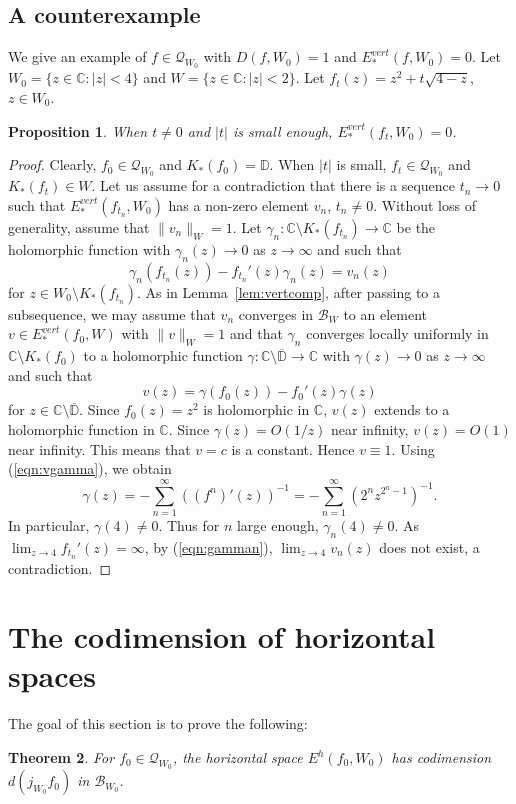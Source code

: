 \documentclass{amsart}
\numberwithin{equation}{section}
\newtheorem{theorem}{Theorem}[section]
\newtheorem{proposition}[theorem]{Proposition}%
\newcommand{\C}{\mathbb C}
\theoremstyle{definition}
\theoremstyle{remark}
\begin{document}
\subsection{A counterexample}\label{subsec:counterex}
We give an example of $f\in \mathcal{Q}_{W_0}$ with $D(f,W_0)=1$ and $E^{vert}_*(f,W_0)=0$. Let $W_0=\{z\in \C:|z|<4\}$ and $W=\{z\in \C: |z|<2\}$. Let $f_t(z)=z^2+t \sqrt{4-z}$, $z\in W_0$. 
\begin{proposition}\label{prop:counterex}
When $t\not=0$ and $|t|$ is small enough, $E^{vert}_*(f_t, W_0)=0$. 
\end{proposition}
\begin{proof}
Clearly, $f_0\in \mathcal{Q}_{W_0}$ and $K_*(f_0)=\mathbb{D}$. When $|t|$ is small, $f_t\in \mathcal{Q}_{W_0}$ and $K_*(f_t)\in W$. 
Let us assume for a contradiction that there is a sequence $t_n\to 0$ such that $E^{vert}_*(f_{t_n}, W_0)$ has a non-zero element $v_n$, $t_n\not=0$. Without loss of generality, assume that $\|v_n\|_{W}=1$. Let $\gamma_n:\C\setminus K_*(f_{t_n})\to \C$ be the holomorphic function with $\gamma_n(z)\to 0$ as $z\to \infty$ and such that 
\begin{equation}\label{eqn:gamman}
\gamma_n(f_{t_n}(z))-f_{t_n}'(z) \gamma_n(z)=v_n(z)
\end{equation}
for $z\in W_0\setminus K_*(f_{t_n})$. As in Lemma~\ref{lem:vertcomp}, after passing to a subsequence, we may assume that $v_n$ converges in $\mathcal{B}_{W}$ to an element $v\in E^{vert}_*(f_0, W)$ with $\|v\|_{W}=1$ and that $\gamma_n$ converges locally uniformly in $\C\setminus K_*(f_0)$ to a holomorphic function $\gamma:\C\setminus \overline{\mathbb{D}}\to \C$ with $\gamma(z)\to 0$ as $z\to \infty$ and such that 
\begin{equation}\label{eqn:vgamma}
v(z)=\gamma(f_0(z))-f_0'(z) \gamma(z)
\end{equation} for $z\in \C\setminus \overline{\mathbb{D}}$. 
Since $f_0(z)=z^2$ is holomorphic in $\C$, $v(z)$ extends to a holomorphic function in $\C$. Since $\gamma(z)=O(1/z)$ near infinity, $v(z)=O(1)$ near infinity. This means that $v=c$ is a constant. Hence $v\equiv 1$. Using (\ref{eqn:vgamma}), we obtain
$$\gamma(z)=-\sum_{n=1}^\infty ((f^n)'(z))^{-1}=-\sum_{n=1}^\infty (2^n z^{2^n-1})^{-1}.$$ 
In particular, $\gamma(4)\not=0$. Thus for $n$ large enough, $\gamma_n(4)\not=0$. 
As $\lim_{z\to 4}f_{t_n}'(z)=\infty$, by (\ref{eqn:gamman}), $\lim_{z\to 4} v_n(z)$ does not exist, a contradiction. 
\end{proof}


\section{The codimension of horizontal spaces}\label{sec:codim}
The goal of this section is to prove the following:
\begin{theorem}\label{thm:dimension}
For $f_0\in \mathcal{Q}_{W_0}$,  the horizontal space $E^h(f_0,W_0)$ has codimension $d(j_{W_0}f_0)$ in $\mathcal{B}_{W_0}$. 
\end{theorem}
\end{document}
